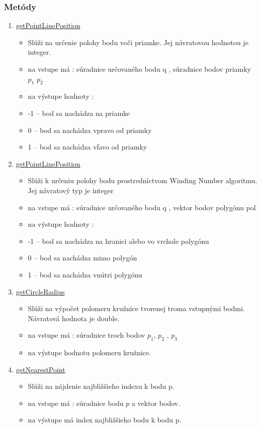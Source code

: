 \documentclass[12pt]{article}
\begin{document}
\subsubsection{Metódy}
\begin{enumerate}
\item[] \underline{getPointLinePosition}
\begin{itemize}
\item Slúži na určenie polohy bodu voči priamke. Jej návratovou hodnotou je integer.
\item na vstupe má : súradnice určovaného bodu q , súradnice bodov priamky $p_1$ $p_2$
\item na výstupe hodnoty :
\item[] -1 – bod sa nachádza na priamke
\item[] 0 – bod sa nachádza vpravo od priamky
\item[] 1 – bod sa nachádza vľavo od priamky
\end{itemize}

\item[] \underline{getPointLinePosition}
\begin{itemize}
\item Slúži k určeniu polohy bodu prostredníctvom Winding Number algoritmu. Jej návratový typ je integer
\item na vstupe má : súradnice určovaného bodu q , vektor bodov polygónu pol
\item na výstupe hodnoty :
\item[] -1 – bod sa nachádza na hranici alebo vo vrchole polygónu
\item[] 0 – bod sa nachádza mimo polygón
\item[] 1 – bod sa nachádza vnútri polygónu
\end{itemize}

\item[] \underline{getCircleRadius}
\begin{itemize}
\item Slúži na výpočet polomeru kružnice tvorenej troma vstupnými bodmi. Návratová hodnota je double.
\item na vstupe má : súradnice troch bodov $p_1$, $p_2$ , $p_3$
\item na výstupe hodnotu polomeru kružnice.
\end{itemize}

\item[] \underline{getNearestPoint}
\begin{itemize}
\item Slúži na nájdenie najbližšieho indexu k bodu p. 
\item na vstupe má : súradnice bodu  $p$  a vektor bodov.
\item na výstupe má index najbližšieho bodu k bodu p.
\end{itemize}


\end{enumerate}
\end{document}
